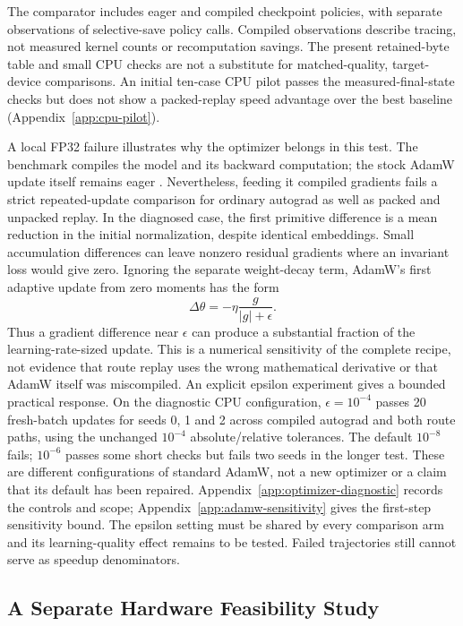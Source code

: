 \documentclass{article}
\theoremstyle{plain}
\theoremstyle{definition}
\theoremstyle{remark}
\begin{document}
The comparator includes eager and compiled checkpoint policies, with
separate observations of selective-save policy calls. Compiled observations
describe tracing, not measured kernel counts or recomputation savings.
The present retained-byte table and small CPU checks are not a substitute
for matched-quality, target-device comparisons.
An initial ten-case CPU pilot passes the measured-final-state checks but
does not show a packed-replay speed advantage over the best baseline
(Appendix~\ref{app:cpu-pilot}).

A local FP32 failure illustrates why the optimizer belongs in this test.
The benchmark compiles the model and its backward computation; the stock
AdamW update itself remains eager \citep{loshchilov2019adamw}. Nevertheless, feeding it compiled
gradients fails a strict repeated-update comparison for ordinary autograd
as well as packed and unpacked replay. In the diagnosed case, the first
primitive difference is a mean reduction in the initial normalization,
despite identical embeddings. Small accumulation differences can leave
nonzero residual gradients where an invariant loss would give zero.
Ignoring the separate weight-decay term, AdamW's first adaptive update
from zero moments has the form
\begin{equation}
 \Delta\theta=-\eta\frac{g}{|g|+\epsilon}.
\end{equation}
Thus a gradient difference near $\epsilon$ can produce a substantial
fraction of the learning-rate-sized update. This is a numerical
sensitivity of the complete recipe, not evidence that route replay uses
the wrong mathematical derivative or that AdamW itself was miscompiled.
An explicit epsilon experiment gives a bounded practical response. On the
diagnostic CPU configuration, $\epsilon=10^{-4}$ passes 20 fresh-batch
updates for seeds 0, 1 and 2 across compiled autograd and both route paths,
using the unchanged $10^{-4}$ absolute/relative tolerances. The default
$10^{-8}$ fails; $10^{-6}$ passes some short checks but fails two seeds in
the longer test. These are different configurations of standard AdamW,
not a new optimizer or a claim that its default has been repaired.
Appendix~\ref{app:optimizer-diagnostic} records the controls and scope;
Appendix~\ref{app:adamw-sensitivity} gives the first-step sensitivity bound.
The epsilon setting must be shared by every comparison arm and its
learning-quality effect remains to be tested. Failed trajectories still
cannot serve as speedup denominators.

\subsection{A Separate Hardware Feasibility Study}
\end{document}
